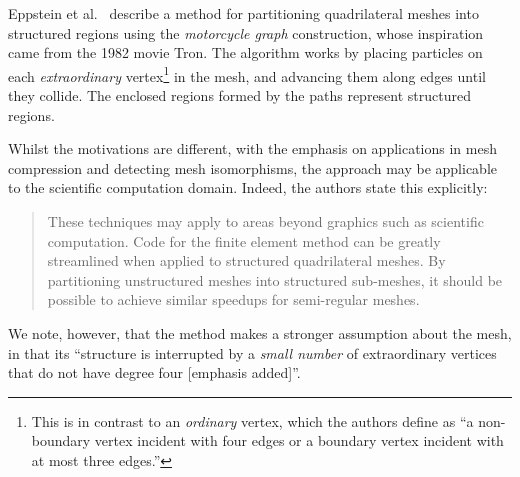 


Eppstein et al.~\cite{eppstein2008motorcycle} describe a method for partitioning quadrilateral meshes into structured regions using the \emph{motorcycle graph} construction, whose inspiration came from the 1982 movie Tron. The algorithm works by placing particles on each \emph{extraordinary} vertex\footnote{\label{footnote:extraordinary-vertices} This is in contrast to an \emph{ordinary} vertex, which the authors define as ``a non-boundary vertex incident with four edges or a boundary vertex incident with at most three edges.''} in the mesh, and advancing them along edges until they collide. The enclosed regions formed by the paths represent structured regions.

Whilst the motivations are different, with the emphasis on applications in mesh compression and detecting mesh isomorphisms, the approach may be applicable to the scientific computation domain. Indeed, the authors state this explicitly:
\begin{quote}
These techniques may apply to areas beyond graphics such as scientific computation. Code for the finite element method can be greatly streamlined when applied to structured quadrilateral meshes. By partitioning unstructured meshes into structured sub-meshes, it should be possible to achieve similar speedups for semi-regular meshes.
\end{quote}

We note, however, that the method makes a stronger assumption about the mesh, in that its ``structure is interrupted by a \emph{small number} of extraordinary vertices that do not have degree four [emphasis added]''.



